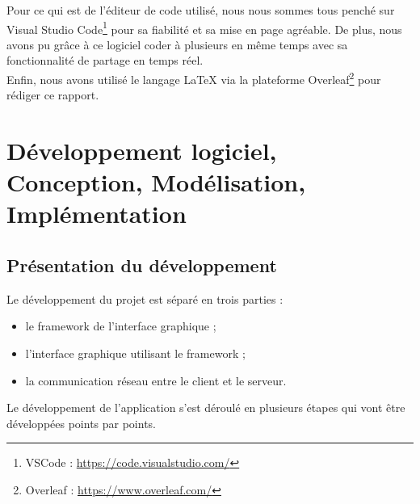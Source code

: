 \documentclass{report}
\begin{document}
Pour ce qui est de l'éditeur de code utilisé, nous nous sommes tous penché sur Visual Studio Code\footnote{VSCode : \url{https://code.visualstudio.com/}} pour sa fiabilité et sa mise en page agréable. De plus, nous avons pu grâce à ce logiciel coder à plusieurs en même temps avec sa fonctionnalité de partage en temps réel. \\

Enfin, nous avons utilisé le langage \LaTeX{} via la plateforme Overleaf\footnote{Overleaf : \url{https://www.overleaf.com/}} pour rédiger ce rapport.


\chapter{Développement logiciel, Conception, Modélisation, Implémentation}
\section{Présentation du développement}
Le développement du projet est séparé en trois parties : 
\begin{itemize}[label=$-$, leftmargin=1.5cm]
    \item le framework de l'interface graphique ;
    \item l'interface graphique utilisant le framework ;
    \item la communication réseau entre le client et le serveur.
\end{itemize}

Le développement de l'application s'est déroulé en plusieurs étapes qui vont être développées points par points.
\end{document}
